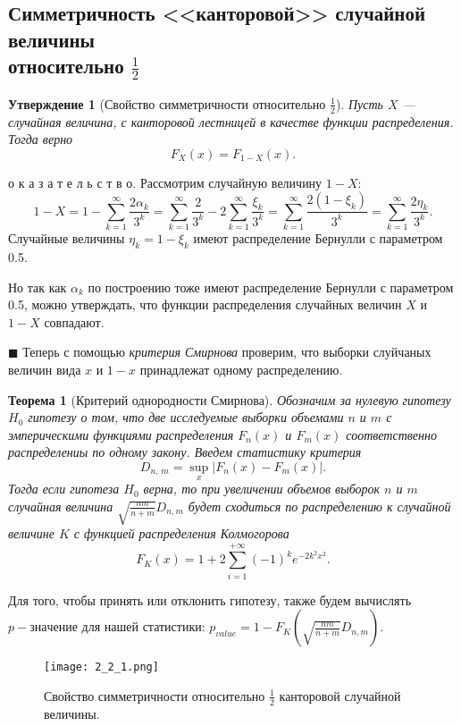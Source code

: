 \documentclass[a4paper, 11pt]{article}
\theoremstyle{def}
\theoremstyle{th}
\newtheorem{theorem}{Теорема}[section]
\newtheorem{assertion}{Утверждение}[section]
\theoremstyle{rem}
\renewenvironment{proof}{\parД о к а з а т е л ь с т в о.}{\hfill$\blacksquare$}
\begin{document}
\subsection{Симметричность <<канторовой>> случайной величины \\ относительно $\frac{1}{2}$}

\begin{assertion}[Свойство симметричности относительно $\frac{1}{2}$]
        Пусть $X$ --- случайная величина, с канторовой лестницей в качестве функции распределения. Тогда верно
$$
        F_X(x) = F_{1-X}(x).
$$
\end{assertion}
\begin{proof}
    Рассмотрим случайную величину $1-X$:
$$
        1 - X
        =
        1 - \sum_{k=1}^\infty\frac{2\alpha_k}{3^k}
        =
        \sum_{k=1}^\infty\frac{2}{3^k} - 2 \sum_{k=1}^\infty\frac{\xi_k}{3^k}
        =
        \sum_{k=1}^\infty\frac{2(1 - \xi_k)}{3^k}
        =
        \sum_{k=1}^\infty\frac{2\eta_k}{3^k}.
$$ 
        Случайные величины $\eta_k = 1 - \xi_k$ имеют распределение Бернулли с параметром 0.5.
        
        Но так как $\alpha_k$ по построению тоже имеют распределение Бернулли с параметром 0.5, можно утверждать, что функции распределения случайных величин $X$ и $1-X$ совпадают.

\end{proof}
Теперь с помощью \textit{критерия Смирнова} проверим, что выборки слуйчаных величин вида $x$ и $1-x$ принадлежат одному распределению. 
\begin{theorem}[Критерий однородности Смирнова]
        Обозначим за нулевую гипотезу $H_0$ гипотезу о том, что две исследуемые выборки объемами $n$ и $m$ с эмперическими функциями распределения $F_n(x)$ и $F_m(x)$ соответственно распределениы по одному закону. Введем статистику критерия
$$
        D_{n,\,m} = \sup\limits_{x}|F_n(x) - F_m(x)|.
$$
Тогда если гипотеза $H_0$ верна, то при увеличении объемов выборок $n$ и $m$ случайная величина $\sqrt{\frac{nm}{n + m}}D_{n,m}$ будет сходиться по распределению к случайной величине $K$ с функцией распределения Колмогорова
$$
       F_K(x) = 1 + 2\sum_{i = 1}^{+\infty} (-1)^k e^{-2k^2x^2}. 
$$
\end{theorem}
Для того, чтобы принять или отклонить гипотезу, также будем вычислять $p-значение$ для нашей статистики: $p_{value} = 1 - F_K\left(\sqrt{\frac{nm}{n+m}}D_{n, m}\right).$
\begin{figure}[H]
        \centering
        \texttt{[image: 2\_2\_1.png]}
        \caption{Свойство симметричности относительно $\frac{1}{2}$ канторовой случайной величины.}
\end{figure}
\end{document}
